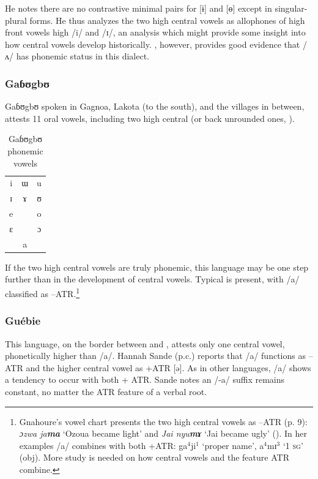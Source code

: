 \documentclass[output=paper,newtxmath,modfonts,nonflat]{langsci/langscibook}
\begin{document}
He notes there are no contrastive minimal pairs for [ɨ] and [ɵ] except in sin\-gular-plu\-ral forms. He thus analyzes the two high central vowels as allophones of high front vowels high /i/ and /ɪ/, an analysis which might provide some insight into how central vowels develop historically. \citet{Vahoua2011}, however, provides good evidence that /ʌ/ has phonemic status in this dialect.    

\subsubsection{Gaɓʊgbʊ}
Gaɓʊgbʊ spoken in Gagnoa, Lakota (to the south), and the villages in between, attests 11 oral vowels, including two high central (or back unrounded ones, \citealt[5, 9]{Gnahore2006}). 

\begin{table}
	\caption{Gaɓʊgbʊ phonemic vowels}
	\label{tab:zogbo:13} 
	\begin{tabular}{ccc}
i  &  ɯ  &   u\\

ɪ    & ɤ &   ʊ\\

e    & &   o\\

ɛ    & &  ɔ\\

	& a\\
	\end{tabular}
\end{table}


If the two high central vowels are truly phonemic, this language may be one step further than  in the development of central vowels. Typical  is present, with /a/ classified as –ATR.\footnote{Gnahoure’s vowel chart presents the two high central vowels as –ATR (p. 9): \textit{ɔzwa ja}\textbf{\textit{ma}} ‘Ozoua became light’ and \textit{Jai nyu}\textbf{\textit{m}}\textbf{\textit{ɤ}} ‘Jai became ugly’ (\citeyear[25]{Gnahore2006}).  In her examples /a/ combines with both +ATR:  ga$^4$ji$^1$ ‘proper name’, a$^4$mɪ$^3$ ‘1 \textsc{sg}’ (obj).  More study is needed on how central vowels and the feature ATR combine.} 

\subsubsection{Guébie}
This language, on the border between  and , attests only one central vowel, phonetically higher than /a/. Hannah Sande (p.c.) reports that /a/ functions as –ATR and the higher central vowel as +ATR [ə].  As in other  languages, /a/ shows a tendency to occur with both + ATR.  Sande notes an /-a/ suffix remains constant, no matter the ATR feature of a verbal root. 
\end{document}

